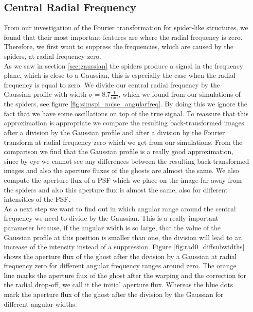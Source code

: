 \subsection{Central Radial Frequency}
\label{sec:central_radial_freq}
From our investigation of the Fourier transformation for spider-like structures, we found that their most important features are where the radial frequency is zero. Therefore, we first want to suppress the frequencies, which are caused by the spiders, at radial frequency zero.\\
As we saw in section \ref{sec:gaussian} the spiders produce a signal in the frequency plane, which is close to a Gaussian, this is especially the case when the radial frequency is equal to zero. We divide our central radial frequency by the Gaussian profile with width $\sigma = 8.7 \frac{1}{\mathrm{rad}}$, which we found from our simulations of the spiders, see figure \ref{fig:simspi_noise_angularfreq}. By doing this we ignore the fact that we have some oscillations on top of the true signal. To reassure that this approximation is appropriate we compare the resulting back-transformed images after a division by the Gaussian profile and after a division by the Fourier transform at radial frequency zero which we get from our simulations. From the comparison we find that the Gaussian profile is a really good approximation, since by eye we cannot see any differences between the resulting back-transformed images and also the aperture fluxes of the ghosts are almost the same. We also compute the aperture flux of a PSF which we place on the image far away from the spiders and also this aperture flux is almost the same, also for different intensities of the PSF.\\
As a next step we want to find out in which angular range around the central frequency we need to divide by the Gaussian. This is a really important parameter because, if the angular width is so large, that the value of the Gaussian profile at this position is smaller than one, the division will lead to an increase of the intensity instead of a suppression. Figure \ref{fig:rad0_diffsubwidths} shows the aperture flux of the ghost after the division by a Gaussian at radial frequency zero for different angular frequency ranges around zero. The orange line marks the aperture flux of the ghost after the warping and the correction for the radial drop-off, we call it the initial aperture flux. Whereas the blue dots mark the aperture flux of the ghost after the division by the Gaussian for different angular widths.\\
